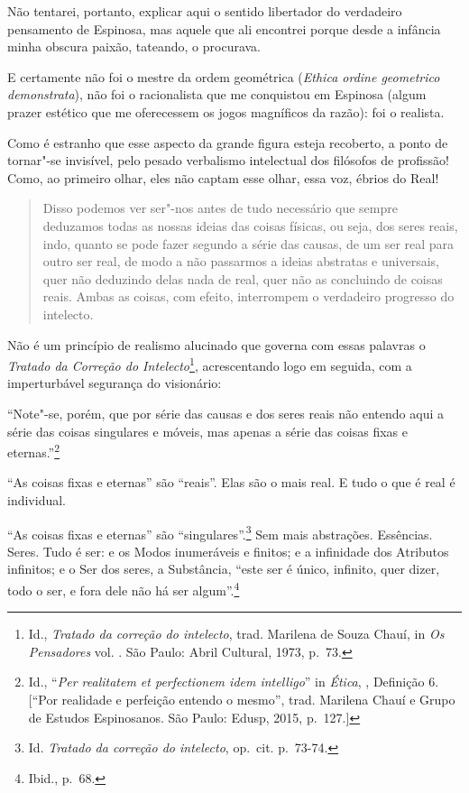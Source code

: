 Não tentarei, portanto, explicar aqui o sentido libertador do verdadeiro
pensamento de Espinosa, mas aquele que ali encontrei porque desde a
infância minha obscura paixão, tateando, o procurava.

E certamente não foi o mestre da ordem geométrica (\emph{Ethica ordine
geometrico demonstrata}), não foi o racionalista que me conquistou em
Espinosa (algum prazer estético que me oferecessem os jogos magníficos
da razão): foi o realista.

Como é estranho que esse aspecto da grande figura esteja recoberto, a
ponto de tornar"-se invisível, pelo pesado verbalismo intelectual dos
filósofos de profissão! Como, ao primeiro olhar, eles não captam esse
olhar, essa voz, ébrios do Real!

\begin{quote}
Disso podemos ver ser"-nos antes de tudo necessário que sempre deduzamos
todas as nossas ideias das coisas físicas, ou seja, dos seres reais,
indo, quanto se pode fazer segundo a série das causas, de um ser real
para outro ser real, de modo a não passarmos a ideias abstratas e
universais, quer não deduzindo delas nada de real, quer não as
concluindo de coisas reais. Ambas as coisas, com efeito, interrompem o
verdadeiro progresso do intelecto.
\end{quote}

Não é um princípio de realismo alucinado que governa com essas palavras
o \emph{Tratado da Correção do Intelecto}\footnote{Id., \emph{Tratado da
  correção do intelecto}, trad. Marilena de Souza Chauí, in \emph{Os
    Pensadores} vol. . São Paulo: Abril Cultural, 1973, p.~73.},
acrescentando logo em seguida, com a imperturbável segurança do
visionário:

``Note"-se, porém, que por série das causas e dos seres reais
não entendo aqui a série das coisas singulares e móveis, mas apenas a
série das coisas fixas e eternas.''\footnote{Id., ``\emph{Per realitatem
  et perfectionem idem intelligo}'' in \emph{Ética}, , Definição 6.
  {[}``Por realidade e perfeição entendo o mesmo'', trad. Marilena Chauí
  e Grupo de Estudos Espinosanos. São Paulo: Edusp, 2015, p.~127.{]}}

``As coisas fixas e eternas'' são ``reais''. Elas são o mais real. E
tudo o que é real é individual.

``As coisas fixas e eternas'' são
``singulares''.\footnote{Id. \emph{Tratado da correção do intelecto},
  op.~cit. p.~73-74.} Sem mais abstrações. Essências. Seres. Tudo é ser:
e os Modos inumeráveis e finitos; e a infinidade dos Atributos
infinitos; e o Ser dos seres, a Substância, ``este ser é único,
infinito, quer dizer, todo o ser, e fora dele não há ser
algum''.\footnote{Ibid., p.~68.}

